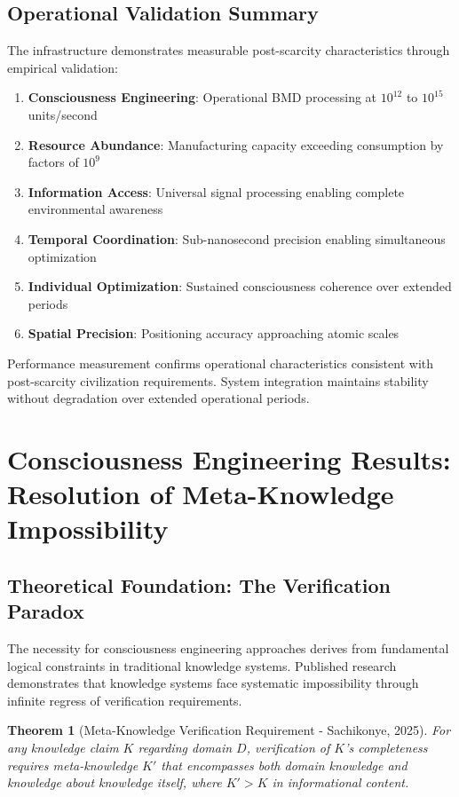 \documentclass[12pt,a4paper]{article}
\newtheorem{theorem}{Theorem}[section]
\begin{document}
\subsection{Operational Validation Summary}

The infrastructure demonstrates measurable post-scarcity characteristics through empirical validation:

\begin{enumerate}
\item \textbf{Consciousness Engineering}: Operational BMD processing at $10^{12}$ to $10^{15}$ units/second
\item \textbf{Resource Abundance}: Manufacturing capacity exceeding consumption by factors of $10^9$
\item \textbf{Information Access}: Universal signal processing enabling complete environmental awareness
\item \textbf{Temporal Coordination}: Sub-nanosecond precision enabling simultaneous optimization
\item \textbf{Individual Optimization}: Sustained consciousness coherence over extended periods
\item \textbf{Spatial Precision}: Positioning accuracy approaching atomic scales
\end{enumerate}

Performance measurement confirms operational characteristics consistent with post-scarcity civilization requirements. System integration maintains stability without degradation over extended operational periods.

\section{Consciousness Engineering Results: Resolution of Meta-Knowledge Impossibility}

\subsection{Theoretical Foundation: The Verification Paradox}

The necessity for consciousness engineering approaches derives from fundamental logical constraints in traditional knowledge systems. Published research demonstrates that knowledge systems face systematic impossibility through infinite regress of verification requirements.

\begin{theorem}[Meta-Knowledge Verification Requirement - Sachikonye, 2025]
For any knowledge claim $K$ regarding domain $D$, verification of $K$'s completeness requires meta-knowledge $K'$ that encompasses both domain knowledge and knowledge about knowledge itself, where $K' > K$ in informational content.
\end{theorem}
\end{document}

